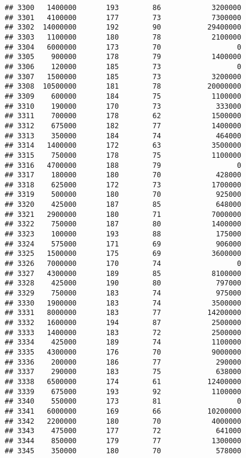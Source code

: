 \documentclass[
]{article}
\begin{document}
\begin{verbatim}
## 3300   1400000       193        86            3200000
## 3301   4100000       177        73            7300000
## 3302  14000000       192        90           29400000
## 3303   1100000       180        78            2100000
## 3304   6000000       173        70                  0
## 3305    900000       178        79            1400000
## 3306    120000       185        73                  0
## 3307   1500000       185        73            3200000
## 3308  10500000       181        78           20000000
## 3309    600000       184        75            1100000
## 3310    190000       170        73             333000
## 3311    700000       178        62            1500000
## 3312    675000       182        77            1400000
## 3313    350000       184        74             464000
## 3314   1400000       172        63            3500000
## 3315    750000       178        75            1100000
## 3316   4700000       188        79                  0
## 3317    180000       180        70             428000
## 3318    625000       172        73            1700000
## 3319    500000       180        70             925000
## 3320    425000       187        85             648000
## 3321   2900000       180        71            7000000
## 3322    750000       187        80            1400000
## 3323    100000       193        88             175000
## 3324    575000       171        69             906000
## 3325   1500000       175        69            3600000
## 3326   7000000       170        74                  0
## 3327   4300000       189        85            8100000
## 3328    425000       190        80             797000
## 3329    750000       183        74             975000
## 3330   1900000       183        74            3500000
## 3331   8000000       183        77           14200000
## 3332   1600000       194        87            2500000
## 3333   1400000       183        72            2500000
## 3334    425000       189        74            1100000
## 3335   4300000       176        70            9000000
## 3336    200000       186        77             290000
## 3337    290000       183        75             638000
## 3338   6500000       174        61           12400000
## 3339    675000       193        92            1100000
## 3340    550000       173        81                  0
## 3341   6000000       169        66           10200000
## 3342   2200000       180        70            4000000
## 3343    475000       177        72             641000
## 3344    850000       179        77            1300000
## 3345    350000       180        70             578000

\end{verbatim}
\end{document}
